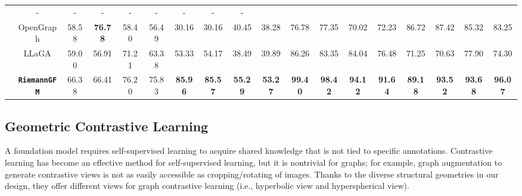 \begin{table*}[ht]
{\begin{tabular}{c  c | cc cccc c c | cc cccccc}
    & - & - & - & - & - & - & - & - \\
    & OpenGraph\cite{xia2024opengraph}
    & 58.58 & \textbf{76.78 }& 58.40 & 56.49 & 30.16 & 30.16 & 40.45 & 38.28
    & 76.78 & 77.35 & 70.02 & 72.23 & 86.72 & 87.42 & 85.32 & 83.25 \\
    & LLaGA \cite{icml24llaga}
    & 59.00 & 56.91 & 71.21 & 63.38 & 53.33 & 54.17 & 38.49 & 39.89
    & 86.26 & 83.35 & 84.04 & 76.48 & 71.25 & 70.63 & 77.90 & 74.30 \\
    \hline
    & \textbf{\texttt{RiemannGFM}}
    & 66.38  & 66.41  & 76.20  & 75.83  & \textbf{85.96}  & \textbf{85.57}  & \textbf{55.29}  & \textbf{53.27} 
    & \textbf{99.40}  & \textbf{98.42}  & \textbf{94.12} & \textbf{91.64}  & \textbf{89.18} & \textbf{93.52}& \textbf{93.68} & \textbf{96.07}  \\
    \hline
    \end{tabular}
    }
        \vspace{-0.1in}
    \end{table*}

\vspace{-0.05in}
\subsection{Geometric Contrastive Learning} \label{sec:gcl}
A foundation model requires self-supervised learning to 
acquire shared knowledge that is not tied to specific annotations.
Contrastive learning has become an effective method for self-supervised learning, but it is nontrivial for graphs; 
for example, graph augmentation to generate contrastive views is not as easily accessible as cropping/rotating of images.
Thanks to the diverse structural geometries in our design,  they offer different views for graph contrastive learning (i.e., hyperbolic view and hyperspherical view).

